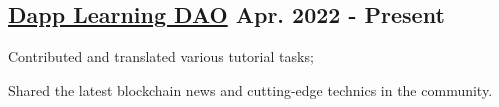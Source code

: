 \subsection{{\href{https://github.com/Dapp-Learning-DAO}{Dapp Learning DAO} \hfill Apr. 2022 - Present}}
\begin{zitemize}
    \item Contributed and translated various tutorial tasks;
    \item Shared the latest blockchain news and cutting-edge technics in the community.
\end{zitemize}
